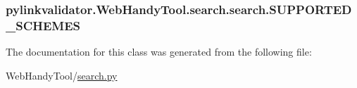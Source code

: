 \subsubsection[{S\+U\+P\+P\+O\+R\+T\+E\+D\+\_\+\+S\+C\+H\+E\+M\+ES}]{\setlength{\rightskip}{0pt plus 5cm}pylinkvalidator.\+Web\+Handy\+Tool.\+search.\+search.\+S\+U\+P\+P\+O\+R\+T\+E\+D\+\_\+\+S\+C\+H\+E\+M\+ES}\hypertarget{classpylinkvalidator_1_1_web_handy_tool_1_1search_1_1search_a40286fb518de4e5067f92d1b65870cf5}{}\label{classpylinkvalidator_1_1_web_handy_tool_1_1search_1_1search_a40286fb518de4e5067f92d1b65870cf5}


The documentation for this class was generated from the following file\+:\begin{DoxyCompactItemize}
\item 
Web\+Handy\+Tool/\hyperlink{search_8py}{search.\+py}\end{DoxyCompactItemize}
